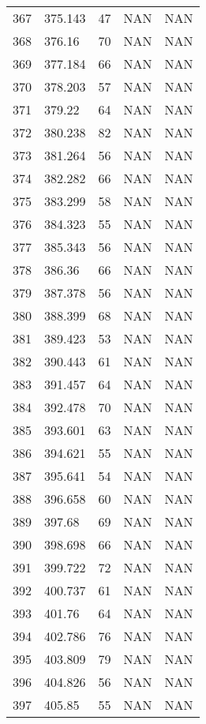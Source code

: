 \documentclass{article}
\begin{document}
\begin{longtable}{@{}lllll@{}}
				367 & 375.143 & 47    & NAN   & NAN   \\
				368 & 376.16  & 70    & NAN   & NAN   \\
				369 & 377.184 & 66    & NAN   & NAN   \\
				370 & 378.203 & 57    & NAN   & NAN   \\
				371 & 379.22  & 64    & NAN   & NAN   \\
				372 & 380.238 & 82    & NAN   & NAN   \\
				373 & 381.264 & 56    & NAN   & NAN   \\
				374 & 382.282 & 66    & NAN   & NAN   \\
				375 & 383.299 & 58    & NAN   & NAN   \\
				376 & 384.323 & 55    & NAN   & NAN   \\
				377 & 385.343 & 56    & NAN   & NAN   \\
				378 & 386.36  & 66    & NAN   & NAN   \\
				379 & 387.378 & 56    & NAN   & NAN   \\
				380 & 388.399 & 68    & NAN   & NAN   \\
				381 & 389.423 & 53    & NAN   & NAN   \\
				382 & 390.443 & 61    & NAN   & NAN   \\
				383 & 391.457 & 64    & NAN   & NAN   \\
				384 & 392.478 & 70    & NAN   & NAN   \\
				385 & 393.601 & 63    & NAN   & NAN   \\
				386 & 394.621 & 55    & NAN   & NAN   \\
				387 & 395.641 & 54    & NAN   & NAN   \\
				388 & 396.658 & 60    & NAN   & NAN   \\
				389 & 397.68  & 69    & NAN   & NAN   \\
				390 & 398.698 & 66    & NAN   & NAN   \\
				391 & 399.722 & 72    & NAN   & NAN   \\
				392 & 400.737 & 61    & NAN   & NAN   \\
				393 & 401.76  & 64    & NAN   & NAN   \\
				394 & 402.786 & 76    & NAN   & NAN   \\
				395 & 403.809 & 79    & NAN   & NAN   \\
				396 & 404.826 & 56    & NAN   & NAN   \\
				397 & 405.85  & 55    & NAN   & NAN   \\

\end{longtable}
\end{document}
